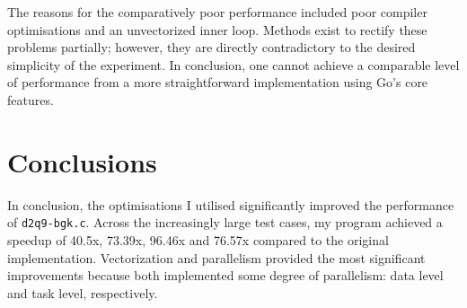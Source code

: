 \documentclass[twocolumn, a4paper]{article}
\begin{document}
The reasons for the comparatively poor performance included poor compiler optimisations and an unvectorized inner loop.
Methods exist to rectify these problems partially; however, they are directly contradictory to the desired simplicity of the experiment.
In conclusion, one cannot achieve a comparable level of performance from a more straightforward implementation using Go's core features.

\section{Conclusions}

In conclusion, the optimisations I utilised significantly improved the performance of \texttt{d2q9-bgk.c}.
Across the increasingly large test cases, my program achieved a speedup of 40.5x, 73.39x, 96.46x and 76.57x compared to the original implementation.
Vectorization and parallelism provided the most significant improvements because both implemented some degree of parallelism: data level and task level, respectively.

\printbibliography
\end{document}
